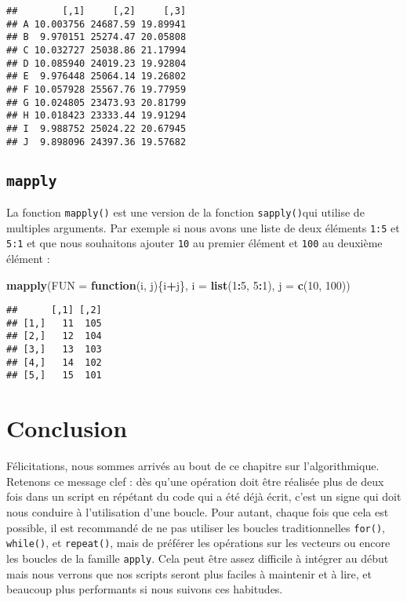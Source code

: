 \documentclass[]{book}
\newenvironment{Shaded}{\begin{snugshade}}{\end{snugshade}}
\newcommand{\KeywordTok}[1]{\textcolor[rgb]{0.13,0.29,0.53}{\textbf{#1}}}
\newcommand{\DataTypeTok}[1]{\textcolor[rgb]{0.13,0.29,0.53}{#1}}
\newcommand{\DecValTok}[1]{\textcolor[rgb]{0.00,0.00,0.81}{#1}}
\newcommand{\ControlFlowTok}[1]{\textcolor[rgb]{0.13,0.29,0.53}{\textbf{#1}}}
\newcommand{\OperatorTok}[1]{\textcolor[rgb]{0.81,0.36,0.00}{\textbf{#1}}}
\newcommand{\NormalTok}[1]{#1}
\theoremstyle{definition}
\theoremstyle{definition}
\theoremstyle{definition}
\theoremstyle{remark}
\begin{document}
\begin{verbatim}
##        [,1]     [,2]     [,3]
## A 10.003756 24687.59 19.89941
## B  9.970151 25274.47 20.05808
## C 10.032727 25038.86 21.17994
## D 10.085940 24019.23 19.92804
## E  9.976448 25064.14 19.26802
## F 10.057928 25567.76 19.77959
## G 10.024805 23473.93 20.81799
## H 10.018423 23333.44 19.91294
## I  9.988752 25024.22 20.67945
## J  9.898096 24397.36 19.57682
\end{verbatim}

\subsection{\texorpdfstring{\texttt{mapply}}{mapply}}\label{l17mapply}

La fonction \texttt{mapply()} est une version de la fonction
\texttt{sapply()}qui utilise de multiples arguments. Par exemple si nous
avons une liste de deux éléments \texttt{1:5} et \texttt{5:1} et que
nous souhaitons ajouter \texttt{10} au premier élément et \texttt{100}
au deuxième élément :

\begin{Shaded}
\begin{Highlighting}[]
\KeywordTok{mapply}\NormalTok{(}\DataTypeTok{FUN =} \ControlFlowTok{function}\NormalTok{(i, j)\{i}\OperatorTok{+}\NormalTok{j\}, }\DataTypeTok{i =} \KeywordTok{list}\NormalTok{(}\DecValTok{1}\OperatorTok{:}\DecValTok{5}\NormalTok{, }\DecValTok{5}\OperatorTok{:}\DecValTok{1}\NormalTok{), }\DataTypeTok{j =} \KeywordTok{c}\NormalTok{(}\DecValTok{10}\NormalTok{, }\DecValTok{100}\NormalTok{))}
\end{Highlighting}
\end{Shaded}

\begin{verbatim}
##      [,1] [,2]
## [1,]   11  105
## [2,]   12  104
## [3,]   13  103
## [4,]   14  102
## [5,]   15  101
\end{verbatim}

\section{Conclusion}\label{conclusion-6}

Félicitations, nous sommes arrivés au bout de ce chapitre sur
l'algorithmique. Retenons ce message clef : dès qu'une opération doit
être réalisée plus de deux fois dans un script en répétant du code qui a
été déjà écrit, c'est un signe qui doit nous conduire à l'utilisation
d'une boucle. Pour autant, chaque fois que cela est possible, il est
recommandé de ne pas utiliser les boucles traditionnelles
\texttt{for()}, \texttt{while()}, et \texttt{repeat()}, mais de préférer
les opérations sur les vecteurs ou encore les boucles de la famille
\texttt{apply}. Cela peut être assez difficile à intégrer au début mais
nous verrons que nos scripts seront plus faciles à maintenir et à lire,
et beaucoup plus performants si nous suivons ces habitudes.
\end{document}
